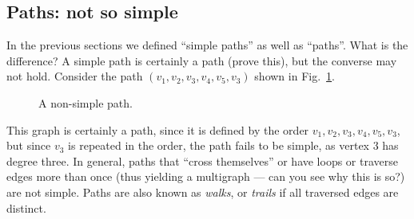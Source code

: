 \documentclass[a4paper]{book}
\theoremstyle{changebreak}                %
\begin{document}
\subsection{Paths: not so simple}
In the previous sections we defined ``simple
paths'' as well as ``paths''. What is
the difference? A simple path is certainly a path (prove this), but
the converse may not hold. Consider the path
$(v_1,v_2,v_3,v_4,v_5,v_3)$ shown in Fig.~\ref{f:path2}.
\begin{figure}[!ht]
\begin{center}
\end{center}
\caption{A non-simple path.}
\label{f:path2}
\end{figure}
This graph is certainly a path, since it is defined by the order
$v_1,v_2,v_3,v_4,v_5,v_3$, but since $v_3$ is repeated in the order,
the path fails to be simple, as vertex 3 has degree three. In general,
paths that ``cross themselves'' or have loops or traverse edges more
than once (thus yielding a multigraph --- can you see why this is so?)
are not simple. Paths are also known as {\it walks}, or
{\it trails} if all traversed edges are distinct.
\end{document}
